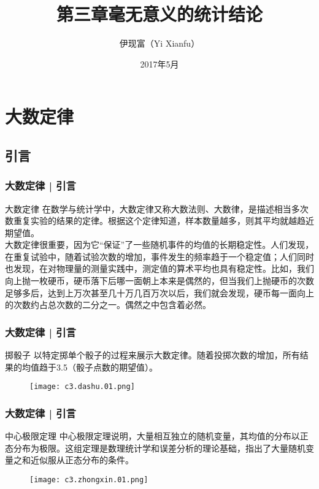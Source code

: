 



\title[无意义的统计]{第三章\quad 毫无意义的统计结论}
\author[Yixf]{伊现富（Yi Xianfu）}
\date{2017年5月}



\section{大数定律}
\subsection{引言}
\begin{frame}
  \frametitle{大数定律 | 引言}
  \begin{block}{大数定律}
    在数学与统计学中，大数定律又称大数法则、大数律，是描述相当多次数重复实验的结果的定律。根据这个定律知道，样本数量越多，则其平均就越趋近期望值。\\
    \vspace{1em}
大数定律很重要，因为它“保证”了一些随机事件的均值的长期稳定性。人们发现，在重复试验中，随着试验次数的增加，事件发生的频率趋于一个稳定值；人们同时也发现，在对物理量的测量实践中，测定值的算术平均也具有稳定性。比如，我们向上抛一枚硬币，硬币落下后哪一面朝上本来是偶然的，但当我们上抛硬币的次数足够多后，达到上万次甚至几十万几百万次以后，我们就会发现，硬币每一面向上的次数约占总次数的二分之一。偶然之中包含着必然。
  \end{block}
\end{frame}

\begin{frame}
  \frametitle{大数定律 | 引言}
  \begin{block}{掷骰子}
    以特定掷单个骰子的过程来展示大数定律。随着投掷次数的增加，所有结果的均值趋于3.5（骰子点数的期望值）。
    \vspace{-1.2em}
    \begin{figure}
      \centering
      \texttt{[image: c3.dashu.01.png]}
    \end{figure}
  \end{block}
\end{frame}

\begin{frame}
  \frametitle{大数定律 | 引言}
  \begin{block}{中心极限定理}
中心极限定理说明，大量相互独立的随机变量，其均值的分布以正态分布为极限。这组定理是数理统计学和误差分析的理论基础，指出了大量随机变量之和近似服从正态分布的条件。
  \vspace{-1em}
  \begin{figure}
    \centering
    \texttt{[image: c3.zhongxin.01.png]}
  \end{figure}
  \end{block}
\end{frame}

